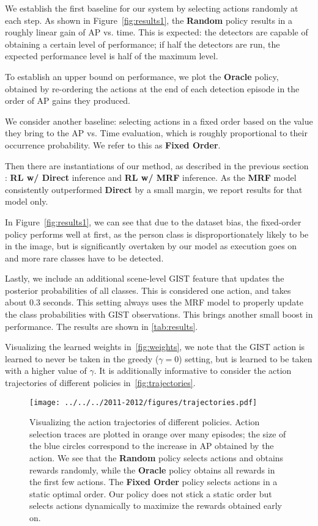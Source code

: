 We establish the first baseline for our system by selecting actions randomly at each step.
As shown in Figure~\autoref{fig:results1}, the \textbf{Random} policy results in a roughly linear gain of AP vs. time.
This is expected: the detectors are capable of obtaining a certain level of performance; if half the detectors are run, the expected performance level is half of the maximum level.

To establish an upper bound on performance, we plot the \textbf{Oracle} policy, obtained by re-ordering the actions at the end of each detection episode in the order of AP gains they produced.

We consider another baseline: selecting actions in a fixed order based on the value they bring to the AP vs. Time evaluation, which is roughly proportional to their occurrence probability.
We refer to this as \textbf{Fixed Order}.

Then there are instantiations of our method, as described in the previous section : \textbf{RL w/ Direct} inference and \textbf{RL w/ MRF} inference.
As the \textbf{MRF} model consistently outperformed \textbf{Direct} by a small margin, we report results for that model only.

In Figure~\autoref{fig:results1}, we can see that due to the dataset bias, the fixed-order policy performs well at first, as the person class is disproportionately likely to be in the image, but is significantly overtaken by our model as execution goes on and more rare classes have to be detected.

Lastly, we include an additional scene-level GIST feature that updates the posterior probabilities of all classes.
This is considered one action, and takes about $0.3$ seconds.
This setting always uses the MRF model to properly update the class probabilities with GIST observations.
This brings another small boost in performance.
The results are shown in \autoref{tab:results}.

Visualizing the learned weights in~\autoref{fig:weights}, we note that the GIST action is learned to never be taken in the greedy ($\gamma=0$) setting, but is learned to be taken with a higher value of $\gamma$.
It is additionally informative to consider the action trajectories of different policies in~\autoref{fig:trajectories}.

\begin{figure}[h!]
  \centering
  \texttt{[image: ../../../2011-2012/figures/trajectories.pdf]}
  \caption{
Visualizing the action trajectories of different policies.
Action selection traces are plotted in orange over many episodes; the size of the blue circles correspond to the increase in AP obtained by the action.
We see that the \textbf{Random} policy selects actions and obtains rewards randomly, while the \textbf{Oracle} policy obtains all rewards in the first few actions.
The \textbf{Fixed Order} policy selects actions in a static optimal order.
Our policy does not stick a static order but selects actions dynamically to maximize the rewards obtained early on.
}
  \label{fig:trajectories}
\end{figure}


